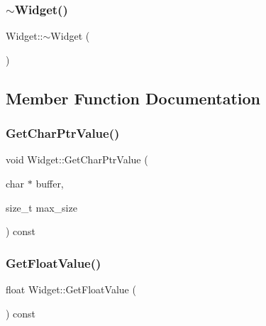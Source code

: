 \mbox{\label{classWidget_aa24f66bcbaaec6d458b0980e8c8eae65}} 
\subsubsection{\texorpdfstring{$\sim$Widget()}{~Widget()}}
{\footnotesize\ttfamily Widget\+::$\sim$\+Widget (\begin{DoxyParamCaption}{ }\end{DoxyParamCaption})}



\subsection{Member Function Documentation}
\mbox{\label{classWidget_a50791a556979f22f5593383143c7f815}} 
\subsubsection{\texorpdfstring{GetCharPtrValue()}{GetCharPtrValue()}}
{\footnotesize\ttfamily void Widget\+::\+Get\+Char\+Ptr\+Value (\begin{DoxyParamCaption}\item[{char $\ast$}]{buffer,  }\item[{size\+\_\+t}]{max\+\_\+size }\end{DoxyParamCaption}) const}

\mbox{\label{classWidget_abf639d975e02cabda8132873aca1a333}} 
\subsubsection{\texorpdfstring{GetFloatValue()}{GetFloatValue()}}
{\footnotesize\ttfamily float Widget\+::\+Get\+Float\+Value (\begin{DoxyParamCaption}{ }\end{DoxyParamCaption}) const}

\mbox{\label{classWidget_a15e7d0423020a7a98063a749fb97bdd3}} 

